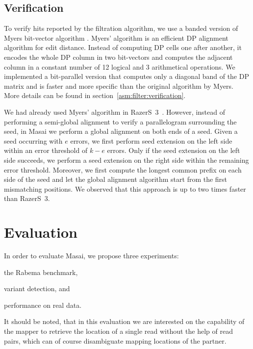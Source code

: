 \subsection{Verification}
\label{masai:engineering:extension}

To verify hits reported by the filtration algorithm, we use a banded version of Myers bit-vector algorithm \citep{Myers1999}.
Myers' algorithm is an efficient DP alignment algorithm \citep{Needleman1970} for edit distance. 
Instead of computing DP cells one after another, it encodes the whole DP column in two bit-vectors and computes the adjacent column in a constant number of 12 logical and 3 arithmetical operations.
We implemented a bit-parallel version that computes only a diagonal band of the DP matrix and is faster and more specific than the original algorithm by Myers.
More details can be found in section~\ref{asm:filter:verification}.

We had already used Myers' algorithm in RazerS~3~\citep{RazerS3}.
However, instead of performing a semi-global alignment to verify a parallelogram surrounding the seed, in Masai we perform a global alignment on both ends of a seed.
Given a seed occurring with $e$ errors, we first perform seed extension on the left side within an error threshold of $k - e$ errors.
Only if the seed extension on the left side succeeds, we perform a seed extension on the right side within the remaining error threshold.
Moreover, we first compute the longest common prefix on each side of the seed and let the global alignment algorithm start from the first mismatching positions.
We observed that this approach is up to two times faster than RazerS~3.


\section{Evaluation}

In order to evaluate Masai, we propose three experiments: \begin{inparaenum}[(i)]
\item the Rabema benchmark,
\item variant detection, and
\item performance on real data.
\end{inparaenum}

It should be noted, that in this evaluation we are interested on the capability of the mapper to retrieve the location of a single read without the help of read pairs, which can of course disambiguate mapping locations of the partner.

